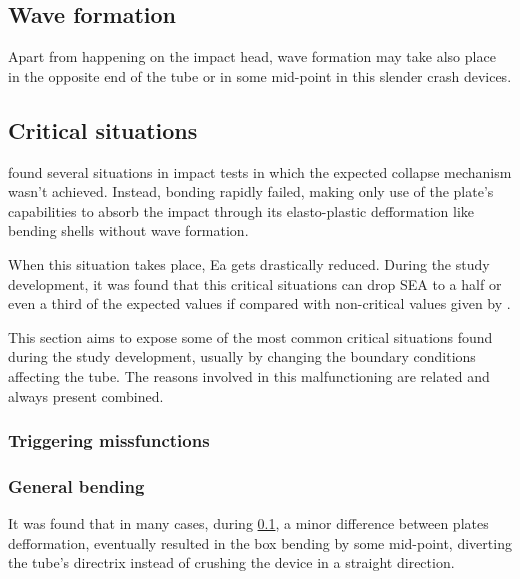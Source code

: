\subsection{Wave formation}
\label{sec:wave_formation}
Apart from happening on the impact head, wave formation may take also place in the opposite end of the tube or in some mid-point \citep{Abedrabbo2009, Costas2013} in this slender crash devices.

\subsection{Critical situations}
\label{sec:critical_sits}
\citet{Peroni2009} found several situations in impact tests in which the expected collapse mechanism wasn't achieved. Instead, bonding rapidly failed, making only use of the plate's capabilities to absorb the impact through its elasto-plastic defformation like bending shells without wave formation.

When this situation takes place, \gls{Ea} gets drastically reduced. During the study development, it was found that this critical situations can drop \gls{SEA} to a half or even a third of the expected values if compared with non-critical values given by \citet{Peroni2009}.

This section aims to expose some of the most common critical situations found during the study development, usually by changing the boundary conditions affecting the tube. The reasons involved in this malfunctioning are related and always present combined.

\subsubsection{Triggering missfunctions}  %
\label{sec:trig_missf}

\subsubsection{General bending}

It was found that in many cases, during \ref{sec:wave_formation}, a minor difference between plates defformation, eventually resulted in the box bending by some mid-point, diverting the tube's directrix instead of crushing the device in a straight direction.


